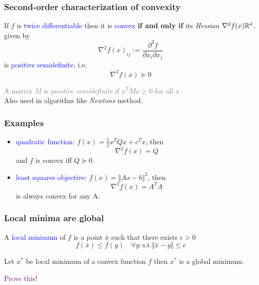 \documentclass{beamer}
\begin{document}
\begin{frame}
  \frametitle{Second-order characterization of convexity}
  If $f$ is \textcolor{blue}{twice differentiable} then it is \textcolor{blue}{convex} \textbf{if and only if} its \emph{Hessian} $\nabla^2 f(x) \mathbb{R}^{d}$, given by
  \begin{equation}
    {\nabla^2 f(x)}_{ij} := \frac{\partial^2 f}{\partial x_i \partial x_j}
  \end{equation}
  is \textcolor{blue}{positive semidefinite}, i.e.
  \begin{equation}
    \nabla^2 f(x) \succcurlyeq 0
  \end{equation}

  \textcolor{gray}{A matrix $M$ is \emph{positive semidefinite} if $x^T M x \ge 0$ for all $x$.}\\
  Also used in algorithm like \emph{Newtons} method.

\end{frame}

\begin{frame}
  \frametitle{Examples}
  \begin{itemize}
    \item \textcolor{blue}{quadratic function:} $f(x)= \frac12 x^T Q x + c^T x$, then
          \begin{equation}
            \nabla^2 f(x) = Q
          \end{equation}
          and $f$ is convex iff $Q \succcurlyeq 0$.
    \item \textcolor{blue}{least squares objective:} $f(x) = \Vert Ax -b \Vert^2$, then
          \begin{equation}
             \nabla^2 f(x) = A^T A
          \end{equation}
          is always convex for any A.
  \end{itemize}
\end{frame}


\begin{frame}
  \frametitle{Local minima are global}

  \begin{definition}
    A \textcolor{blue}{local minimum} of $f$ is a point $\bar{x}$ such that there exists $\epsilon>0$
    \begin{equation}
      f(\bar{x}) \le f(y) \quad \forall y: \text{s.t.} \Vert \bar{x}-y \Vert \le \epsilon
    \end{equation}
  \end{definition}

  \begin{lemma}%
    \label{lem:}
    Let $x^*$ be local minimum of a convex function $f$ then $x^*$ is a global minimum.
  \end{lemma}
\textcolor{purple}{Prove this!}
\end{frame}
\end{document}
